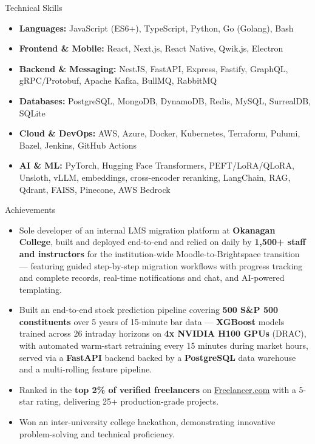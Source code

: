 \documentclass{resume}
\begin{document}
\begin{rSection}{Technical Skills}
\scriptsize
\begin{itemize}[leftmargin=0em,label={},itemsep=0pt,topsep=1pt,parsep=0pt,partopsep=0pt]
\item \textbf{Languages:} JavaScript (ES6+), TypeScript, Python, Go (Golang), Bash
\item \textbf{Frontend \& Mobile:} React, Next.js, React Native, Qwik.js, Electron
\item \textbf{Backend \& Messaging:} NestJS, FastAPI, Express, Fastify, GraphQL, gRPC/Protobuf, Apache Kafka, BullMQ, RabbitMQ
\item \textbf{Databases:} PostgreSQL, MongoDB, DynamoDB, Redis, MySQL, SurrealDB, SQLite
\item \textbf{Cloud \& DevOps:} AWS, Azure, Docker, Kubernetes, Terraform, Pulumi, Bazel, Jenkins, GitHub Actions
\item \textbf{AI \& ML:} PyTorch, Hugging Face Transformers, PEFT/LoRA/QLoRA, Unsloth, vLLM, embeddings, cross-encoder reranking, LangChain, RAG, Qdrant, FAISS, Pinecone, AWS Bedrock
\end{itemize}
\end{rSection}\vspace{-0.5em}

\begin{rSection}{Achievements}
\scriptsize
\begin{itemize}\itemsep -7pt
    \item Sole developer of an internal LMS migration platform at \textbf{Okanagan College}, built and deployed end-to-end and relied on daily by \textbf{1,500+ staff and instructors} for the institution-wide Moodle-to-Brightspace transition --- featuring guided step-by-step migration workflows with progress tracking and complete records, real-time notifications and chat, and AI-powered templating.
    \item Built an end-to-end stock prediction pipeline covering \textbf{500 S\&P 500 constituents} over 5 years of 15-minute bar data --- \textbf{XGBoost} models trained across 26 intraday horizons on \textbf{4x NVIDIA H100 GPUs} (DRAC), with automated warm-start retraining every 15 minutes during market hours, served via a \textbf{FastAPI} backend backed by a \textbf{PostgreSQL} data warehouse and a multi-rolling feature pipeline.
    \item Ranked in the \textbf{top 2\% of verified freelancers} on \href{https://www.freelancer.com/u/misterharshkumar}{Freelancer.com} with a 5-star rating, delivering 25+ production-grade projects.
    \item Won an inter-university college hackathon, demonstrating innovative problem-solving and technical proficiency.
\end{itemize}
\end{rSection}
\end{document}
